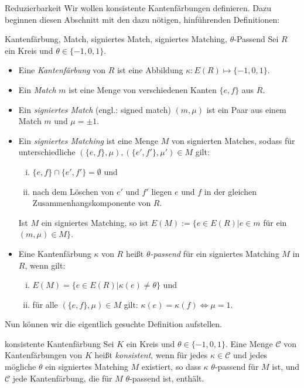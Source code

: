 \begin{section}{Reduzierbarkeit}
 Wir wollen konsistente Kantenfärbungen definieren. Dazu beginnen diesen Abschnitt mit den dazu nötigen, hinführenden Definitionen:

 \begin{definition}{Kantenfärbung, Match, signiertes Match, signiertes Matching, $\theta$-Passend}
  Sei $R$ ein Kreis und $\theta \in \{-1,0,1\}$.
  \begin{itemize}
   \item Eine \textit{Kantenfärbung} von $R$ ist eine Abbildung $\kappa: E(R) \mapsto \{-1,0,1\}$.
   \item Ein \textit{Match} $m$ ist eine Menge von verschiedenen Kanten $\{e,f\}$ aus $R$. 
   \item Ein \textit{signiertes Match} (engl.: signed match) $(m,\mu)$ ist ein Paar aus einem Match $m$ und $\mu = \pm 1$.
   \item Ein \textit{signiertes Matching} ist eine Menge $M$ von signierten Matches, sodass für unterschiedliche $(\{e,f\},\mu),(\{e',f'\},\mu') \in M$ gilt:
   \begin{enumerate}[(i)]
    \item $\{e,f\}\cap\{e',f'\} = \emptyset$ und
    \item nach dem Löschen von $e'$ und $f'$ liegen $e$ und $f$ in der gleichen Zusammenhangskomponente von $R$.
   \end{enumerate}
   Ist $M$ ein signiertes Matching, so ist $E(M) := \{e\in E(R) | e\in m $ für ein $(m,\mu) \in M\}$.
   \item Eine Kantenfärbung $\kappa$ von $R$ heißt \textit{$\theta$-passend} für ein signiertes Matching $M$ in $R$, wenn gilt:
   \begin{enumerate}[(i)]
    \item $E(M) = \{e \in E(R) | \kappa(e) \neq \theta\}$ und
    \item für alle $(\{e,f\},\mu) \in M$ gilt: $\kappa(e) = \kappa(f) \Leftrightarrow \mu = 1$.
   \end{enumerate}
  \end{itemize}
 \end{definition}
 
 Nun können wir die eigentlich gesuchte Definition aufstellen.
  
 \begin{definition}{konsistente Kantenfärbung}
  Sei $K$ ein Kreis und $\theta \in \{-1,0,1\}$. Eine Menge $\mathscr{C}$ von Kantenfärbungen von $K$ heißt \textit{konsistent}, wenn für jedes $\kappa \in \mathscr{C}$ und jedes mögliche $\theta$ ein signiertes Matching $M$ existiert, so dass $\kappa$ $\theta$-passend für $M$ ist, und $\mathscr{C}$ jede Kantenfärbung, die für $M$ $\theta$-passend ist, enthält.
 \end{definition}


\end{section}
